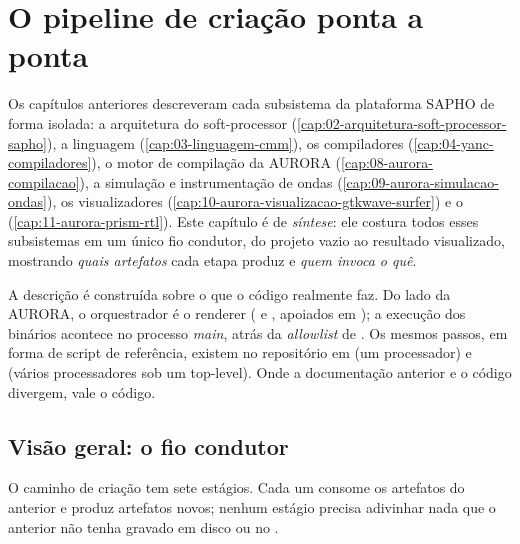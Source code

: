 \chapter{O pipeline de criação ponta a ponta}
\label{cap:17-pipeline-ponta-a-ponta}

Os capítulos anteriores descreveram cada subsistema da plataforma SAPHO de forma
isolada: a arquitetura do soft-processor (\autoref{cap:02-arquitetura-soft-processor-sapho}),
a linguagem \cmm{} (\autoref{cap:03-linguagem-cmm}), os compiladores 
(\autoref{cap:04-yanc-compiladores}), o motor de compilação da AURORA
(\autoref{cap:08-aurora-compilacao}), a simulação e instrumentação de ondas
(\autoref{cap:09-aurora-simulacao-ondas}), os visualizadores
(\autoref{cap:10-aurora-visualizacao-gtkwave-surfer}) e o 
(\autoref{cap:11-aurora-prism-rtl}). Este capítulo é de \emph{síntese}: ele costura
todos esses subsistemas em um único fio condutor, do projeto vazio ao resultado
visualizado, mostrando \emph{quais artefatos} cada etapa produz e \emph{quem invoca
o quê}.

A descrição é construída sobre o que o código realmente faz. Do lado da AURORA, o
orquestrador é o renderer ( e
, apoiados em
); a execução dos binários acontece no
processo \emph{main}, atrás da \emph{allowlist} de
. Os mesmos passos, em forma de script de
referência, existem no repositório  em
 (um processador) e 
(vários processadores sob um top-level). Onde a documentação anterior e o código
divergem, vale o código.

\section{Visão geral: o fio condutor}

O caminho de criação tem sete estágios. Cada um consome os artefatos do anterior e
produz artefatos novos; nenhum estágio precisa adivinhar nada que o anterior não
tenha gravado em disco ou no .

